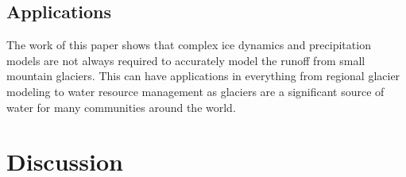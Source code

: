 \documentclass{article}
\begin{document}
\subsection{Applications}
The work of this paper shows that complex ice dynamics and precipitation models are not always required to accurately model the runoff from small mountain glaciers. This 
can have applications in everything from regional glacier modeling to water resource management as glaciers are a significant source of water 
for many communities around the world. 


\section{Discussion}
\end{document}
